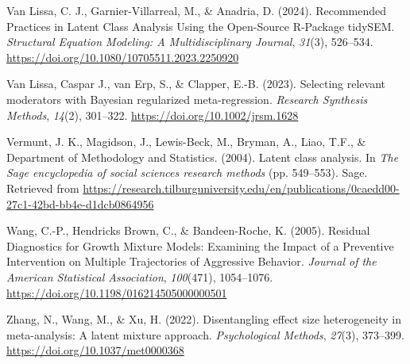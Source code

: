 \documentclass[
  english,
  man, noextraspace,floatsintext]{apa6}
\newlength{\cslhangindent}
\newenvironment{CSLReferences}[2] %
 {\begin{list}{}{%
  \setlength{\itemindent}{0pt}
  \setlength{\leftmargin}{0pt}
  \setlength{\parsep}{0pt}
  \ifodd #1
   \setlength{\leftmargin}{\cslhangindent}
   \setlength{\itemindent}{-1\cslhangindent}
  \fi
  \setlength{\itemsep}{#2\baselineskip}}}
 {\end{list}}
\begin{document}
\begin{CSLReferences}{1}{0}
Van Lissa, C. J., Garnier-Villarreal, M., \& Anadria, D. (2024). Recommended {Practices} in {Latent Class Analysis Using} the {Open-Source R-Package tidySEM}. \emph{Structural Equation Modeling: A Multidisciplinary Journal}, \emph{31}(3), 526--534. \url{https://doi.org/10.1080/10705511.2023.2250920}

Van Lissa, Caspar J., van Erp, S., \& Clapper, E.-B. (2023). Selecting relevant moderators with {Bayesian} regularized meta-regression. \emph{Research Synthesis Methods}, \emph{14}(2), 301--322. \url{https://doi.org/10.1002/jrsm.1628}

Vermunt, J. K., Magidson, J., Lewis-Beck, M., Bryman, A., Liao, T.F., \& Department of Methodology and Statistics. (2004). Latent class analysis. In \emph{The {Sage} encyclopedia of social sciences research methods} (pp. 549--553). Sage. Retrieved from \url{https://research.tilburguniversity.edu/en/publications/0caedd00-27c1-42bd-bb4e-d1dcb0864956}

Wang, C.-P., Hendricks Brown, C., \& Bandeen-Roche, K. (2005). Residual {Diagnostics} for {Growth Mixture Models}: {Examining} the {Impact} of a {Preventive Intervention} on {Multiple Trajectories} of {Aggressive Behavior}. \emph{Journal of the American Statistical Association}, \emph{100}(471), 1054--1076. \url{https://doi.org/10.1198/016214505000000501}

Zhang, N., Wang, M., \& Xu, H. (2022). Disentangling effect size heterogeneity in meta-analysis: {A} latent mixture approach. \emph{Psychological Methods}, \emph{27}(3), 373--399. \url{https://doi.org/10.1037/met0000368}

\end{CSLReferences}
\end{document}
